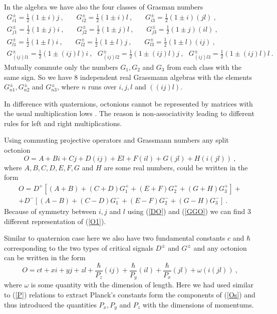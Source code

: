 \documentclass[a4paper,12pt]{article}
\begin{document}
In the algebra we have also the four classes of Grasman numbers 
\begin{eqnarray} \label{GGO}
G^\pm_{i1} = \frac{1}{2}(1 \pm i)j ~, ~~~~~~~~ G^\pm_{i2} = \frac{1}{2}(1 \pm i)l ~,
~~~~~~~~  G^\pm_{i3} = \frac{1}{2}(1 \pm i)(jl) ~, \nonumber\\
G^\pm_{j1} = \frac{1}{2}(1 \pm j)i ~, ~~~~~~~~ G^\pm_{j2} = \frac{1}{2}(1 \pm j)l ~,
~~~~~~~~ G^\pm_{j3} = \frac{1}{2}(1 \pm j)(il) ~, \\
G^\pm_{l1} = \frac{1}{2}(1 \pm l)i ~, ~~~~~~~~ G^\pm_{l2} = \frac{1}{2}(1 \pm l)j ~,
~~~~~~~~  G^\pm_{l3} = \frac{1}{2}(1 \pm l)(ij) ~, \nonumber\\
G^\pm_{(ij)l1} = \frac{1}{2}(1 \pm (ij)l )i ~, ~~~ G^\pm_{(ij)l 2} = 
\frac{1}{2}(1 \pm (ij)l)j ~,~~~ G^\pm_{(ij)l 3} = \frac{1}{2}(1 \pm (ij)l)l ~. \nonumber
\end{eqnarray}
Mutually commute only the numbers $G_1, G_2$ and $G_3$ from each class with the same sign. 
So we have $8$ independent real Grassmann algebras with the elements $G^\pm_{n1}, 
G^\pm_{n2}$ and $ G^\pm_{n3}$, where $n$ runs over $i, j, l$ and $((ij)l)$. 

In difference with quaternions, octonions cannot be represented by matrices with the usual 
multiplication lows \cite{Sc}. The reason is non-associativity leading to different rules 
for left and right multiplications.

Using commuting projective operators and Grassmann numbers any split octonion 
\begin{equation} \label{Os}
O = A + Bi + Cj + D(ij) + El + F(il) + G(jl) + H(i(jl)) ~,
\end{equation}
where $A, B, C, D, E, F, G$ and $H$ are some real numbers, could be written in the form 
\begin{eqnarray} \label{O1}
O = D^+\left[ (A + B) + (C + D)G^+_{1} + (E + F) G^+_{2}  + (G + H) G^+_{3}\right] + \nonumber \\
+ D^-\left[ (A - B) + (C - D)G^-_{1} + (E - F) G^-_{2}  + (G - H) G^-_{3}\right] ~.
\end{eqnarray}
Because of symmetry between $i, j$ and $l$ using (\ref{DO}) and (\ref{GGO}) we can find 
$3$ different representation of (\ref{O1}). 

Similar to quaternion case here we also have two fundamental constants $c$ and $\hbar$ 
corresponding to the two types of critical signals $D^\pm$ and $G^\pm$ and any octonion 
can be written in the form
\begin{equation} \label{Op}
O = ct + xi + yj + zl + \frac{\hbar}{P_z}(ij) + \frac{\hbar}{P_y} (il) + \frac{\hbar}{P_x} (jl) 
+ \omega (i(jl)) ~,
\end{equation}
where $\omega$ is some quantity with the dimension of length. Here we had used similar to 
(\ref{P}) relations to extract Planck's constants form the components of (\ref{Os}) and 
thus introduced the quantities $ P_x, P_y$ and $ P_z $ with the dimensions of momentums. 
\end{document}
